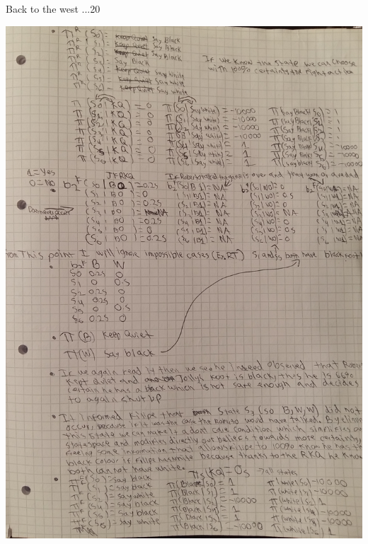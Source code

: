 \begin{questions}
\begin{question}{Back to the west ...}{20}
\begin{answer}
	\includegraphics[scale=0.2]{p5.jpg}	
		\newpage


\end{answer}
\end{question}
\end{questions}
